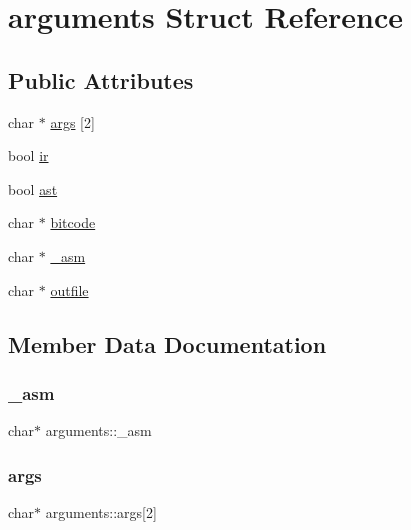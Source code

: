 \hypertarget{structarguments}{}\section{arguments Struct Reference}
\label{structarguments}
\subsection*{Public Attributes}
\begin{DoxyCompactItemize}
\item 
char $\ast$ \hyperlink{structarguments_af17bdefc5e5a3d025f8f7cd9ac23b338}{args} \mbox{[}2\mbox{]}
\item 
bool \hyperlink{structarguments_ab1aff07fb71d590783ff6f274d814bc2}{ir}
\item 
bool \hyperlink{structarguments_a381e594653be3e9d540a3b789992bf10}{ast}
\item 
char $\ast$ \hyperlink{structarguments_ad7610191c7845a084b9c1bd77bdfd5ef}{bitcode}
\item 
char $\ast$ \hyperlink{structarguments_a68dd0b72d998c2af01852bf8bd814328}{\+\_\+asm}
\item 
char $\ast$ \hyperlink{structarguments_aa3e057ae365454e2918a8c6ca4800822}{outfile}
\end{DoxyCompactItemize}


\subsection{Member Data Documentation}
\hypertarget{structarguments_a68dd0b72d998c2af01852bf8bd814328}{}\label{structarguments_a68dd0b72d998c2af01852bf8bd814328} 
\subsubsection{\texorpdfstring{\+\_\+asm}{\_asm}}
{\footnotesize\ttfamily char$\ast$ arguments\+::\+\_\+asm}

\hypertarget{structarguments_af17bdefc5e5a3d025f8f7cd9ac23b338}{}\label{structarguments_af17bdefc5e5a3d025f8f7cd9ac23b338} 
\subsubsection{\texorpdfstring{args}{args}}
{\footnotesize\ttfamily char$\ast$ arguments\+::args\mbox{[}2\mbox{]}}


